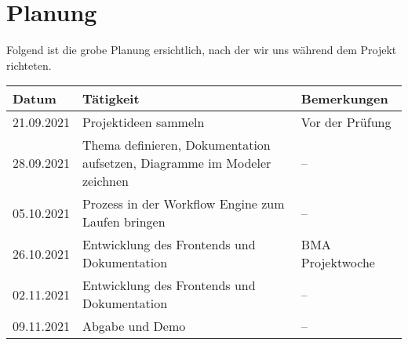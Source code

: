 \chapter{Planung}\label{ch:planung}

Folgend ist die grobe Planung ersichtlich, nach der wir uns während dem Projekt richteten.

\begin{longtable}{|p{}|p{}|p{}|}
    \hline
    \textbf{Datum} & \textbf{Tätigkeit} & \textbf{Bemerkungen}
    \\ \hline
    21.09.2021 & Projektideen sammeln & Vor der Prüfung
    \\ \hline
    28.09.2021 & Thema definieren, Dokumentation aufsetzen, Diagramme im Modeler zeichnen
    & --
    \\ \hline
    05.10.2021 & Prozess in der Workflow Engine zum Laufen bringen & --
    \\ \hline
    26.10.2021 & Entwicklung des Frontends und Dokumentation & BMA Projektwoche
    \\ \hline
    02.11.2021 & Entwicklung des Frontends und Dokumentation & --
    \\ \hline
    09.11.2021 & Abgabe und Demo & --
    \\ \hline
\end{longtable}\label{tab:schedule}
